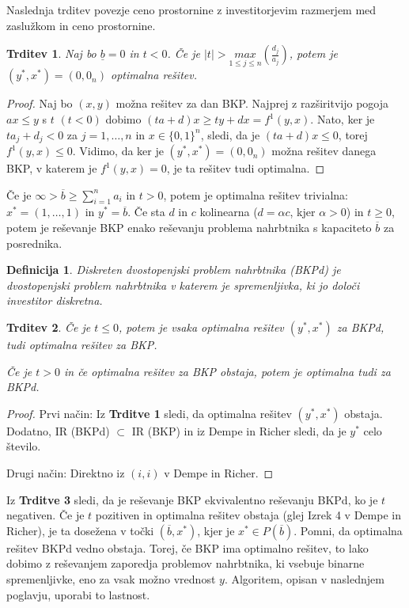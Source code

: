 \documentclass[a4paper, 11pt]{article}
\newtheorem{theorem}{Trditev}
\newtheorem{definition}{Definicija}
\begin{document}
	Naslednja trditev povezje ceno prostornine z investitorjevim razmerjem med zaslužkom in ceno prostornine.
	
	\begin{theorem}
	Naj bo $\underline{b} = 0$ in $t < 0$. Če je  $| t | > \underset{1 \leq j \leq n}{max}(\frac{d_j}{a_j})$,  potem je $(y^*, x^*) = (0, 0_n)$ optimalna rešitev.
	\end{theorem}
	
	\begin{proof}
	Naj bo $(x, y)$ možna rešitev za dan BKP. Najprej z razširitvijo pogoja $ ax \leq y$ s $t$ $(t < 0)$ dobimo $(ta + d)x \geq ty + dx = f^{1}(y,x)$. Nato, ker je $ta_j + d_j < 0$ za $j = 1, \dots , n$ in $ x \in \{0, 1 \}^n$, sledi, da je $(ta + d)x \leq 0$, torej $f^{1}(y,x) \leq 0$. Vidimo, da ker je $(y^*, x^*) = (0, 0_n)$ možna rešitev danega BKP, v katerem je $f^{1}(y,x) = 0$, je ta rešitev tudi optimalna.
	\end{proof}
	
	Če je $\infty > \overline{b} \geq \sum_{i=1}^na_i$ in $t > 0$, potem je optimalna rešitev trivialna: $x^* = (1, \dots, 1)$ in $y^* = \overline{b}$. Če sta $d$ in $c$ kolinearna ($d = \alpha c$, kjer $\alpha > 0$) in $t \geq 0$, potem je reševanje BKP enako reševanju problema nahrbtnika s kapaciteto $\overline{b}$ za posrednika.
	
	\begin{definition}
	Diskreten dvostopenjski problem nahrbtnika (BKPd) je dvostopenjski problem nahrbtnika v katerem je spremenljivka, ki jo določi investitor diskretna.
	\end{definition}

	\begin{theorem}
	Če je $t \leq 0$, potem je vsaka optimalna rešitev $(y^*, x^*)$ za BKPd, tudi optimalna rešitev za BKP.
	
	Če je $t > 0$ in če optimalna rešitev za BKP obstaja, potem je optimalna tudi za BKPd.	
	\end{theorem}
	
	\begin{proof}
	Prvi način: Iz \textbf{Trditve 1} sledi, da optimalna rešitev $(y^*, x^*)$ obstaja. Dodatno, IR (BKPd) $\subset$ IR (BKP) in iz Dempe in Richer sledi, da je $y^*$ celo število.
	
	Drugi način: Direktno iz $(i,i)$ v Dempe in Richer.
	\end{proof}

	Iz \textbf{Trditve 3} sledi, da je reševanje BKP ekvivalentno reševanju BKPd, ko je $t$ negativen. Če je $t$ pozitiven in optimalna rešitev obstaja (glej Izrek 4 v Dempe in Richer), je ta dosežena v točki $(\overline{b}, x^*)$, kjer je $x^* \in P(\overline{b})$. Pomni, da optimalna rešitev BKPd vedno obstaja. Torej, če BKP ima optimalno rešitev, to lako dobimo z reševanjem zaporedja problemov nahrbtnika, ki vsebuje binarne spremenljivke, eno za vsak možno vrednost $y$. Algoritem, opisan v naslednjem poglavju, uporabi to lastnost.
	
\end{document}
